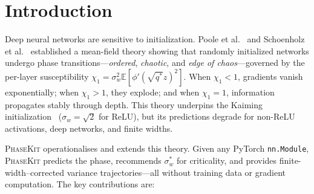 \documentclass[10pt]{article}
\newcommand{\EE}{\mathbb{E}}
\newcommand{\ToolName}{\textsc{PhaseKit}}
\begin{document}
\section{Introduction}
\label{sec:intro}

Deep neural networks are sensitive to initialization.
Poole et al.~\cite{poole2016exponential} and Schoenholz et al.~\cite{schoenholz2017deep} established a mean-field theory showing that randomly initialized networks undergo phase transitions---\emph{ordered}, \emph{chaotic}, and \emph{edge of chaos}---governed by the per-layer susceptibility $\chi_1 = \sigma_w^2 \EE[\phi'(\sqrt{q^*}z)^2]$.
When $\chi_1 < 1$, gradients vanish exponentially; when $\chi_1 > 1$, they explode; and when $\chi_1 = 1$, information propagates stably through depth.
This theory underpins the Kaiming initialization~\cite{he2015delving} ($\sigma_w = \sqrt{2}$ for ReLU), but its predictions degrade for non-ReLU activations, deep networks, and finite widths.

\ToolName{} operationalises and extends this theory.
Given any PyTorch \texttt{nn.Module}, \ToolName{} predicts the phase, recommends $\sigma_w^*$ for criticality, and provides finite-width--corrected variance trajectories---all without training data or gradient computation.
The key contributions are:
\end{document}
